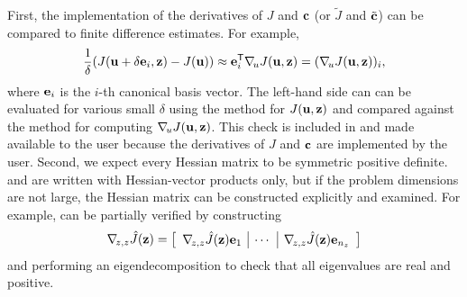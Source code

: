 First, the implementation of the derivatives of $J$ and $\mathbf{c}$ (or $\tilde{J}$ and $\tilde{\mathbf{c}}$) can be compared to finite difference estimates.
For example,
\begin{align}
    \frac{1}{\delta}(J(\mathbf{u} + \delta \mathbf{e}_i, \mathbf{z}) - J(\mathbf{u}))
    \approx \mathbf{e}_i^{\mathsf{T}} \nabla_{\!u}J(\mathbf{u}, \mathbf{z}) = (\nabla_{\!u}J(\mathbf{u},\mathbf{z}))_{i},
\end{align}
where $\mathbf{e}_i$ is the $i$-th canonical basis vector.
The left-hand side can can be evaluated for various small $\delta$ using the method for $J(\mathbf{u},\mathbf{z})$ and compared against the method for computing $\nabla_{\!u}J(\mathbf{u},\mathbf{z})$.
This check is included in  and made available to the user because the derivatives of $J$ and $\mathbf{c}$ are implemented by the user.
Second, we expect every Hessian matrix to be symmetric positive definite.
 and  are written with Hessian-vector products only, but if the problem dimensions are not large, the Hessian matrix can be constructed explicitly and examined.
For example,  can be partially verified by constructing
\begin{align}
    \nabla_{\!z,z}\hat{J}(\mathbf{z})
    = \left[\begin{array}{c|c|c}
        \nabla_{\!z,z}\hat{J}(\mathbf{z})\mathbf{e}_1
        & \cdots &
        \nabla_{\!z,z}\hat{J}(\mathbf{z})\mathbf{e}_{n_z}
    \end{array}\right]
\end{align}
and performing an eigendecomposition to check that all eigenvalues are real and positive.

